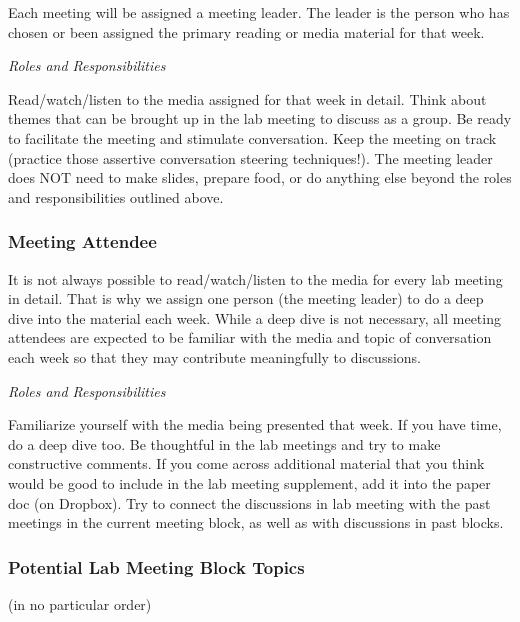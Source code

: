 \documentclass[]{book}
\begin{document}
Each meeting will be assigned a meeting leader. The leader is the person who has chosen or been assigned the primary reading or media material for that week.

\emph{Roles and Responsibilities}

Read/watch/listen to the media assigned for that week in detail.
Think about themes that can be brought up in the lab meeting to discuss as a group.
Be ready to facilitate the meeting and stimulate conversation.
Keep the meeting on track (practice those assertive conversation steering techniques!).
The meeting leader does NOT need to make slides, prepare food, or do anything else beyond the roles and responsibilities outlined above.

\hypertarget{meeting-attendee}{%
\subsubsection{Meeting Attendee}\label{meeting-attendee}}

It is not always possible to read/watch/listen to the media for every lab meeting in detail. That is why we assign one person (the meeting leader) to do a deep dive into the material each week. While a deep dive is not necessary, all meeting attendees are expected to be familiar with the media and topic of conversation each week so that they may contribute meaningfully to discussions.

\emph{Roles and Responsibilities}

Familiarize yourself with the media being presented that week. If you have time, do a deep dive too.
Be thoughtful in the lab meetings and try to make constructive comments.
If you come across additional material that you think would be good to include in the lab meeting supplement, add it into the paper doc (on Dropbox).
Try to connect the discussions in lab meeting with the past meetings in the current meeting block, as well as with discussions in past blocks.

\hypertarget{potential-lab-meeting-block-topics}{%
\subsubsection{Potential Lab Meeting Block Topics}\label{potential-lab-meeting-block-topics}}

(in no particular order)
\end{document}
